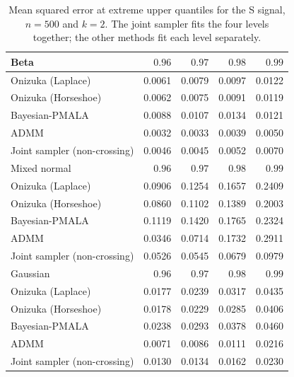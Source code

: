 \begin{table}[!htbp]
\centering
\small
\caption{Mean squared error at extreme upper quantiles for the S signal, $n=500$ and $k=2$. The joint sampler fits the four levels together; the other methods fit each level separately.}
\label{tab:s_ext_upper_mse}
\begin{tabular}{lrrrr}
\toprule
Beta & $0.96$ & $0.97$ & $0.98$ & $0.99$ \\
\midrule
Onizuka (Laplace) & 0.0061 & 0.0079 & 0.0097 & 0.0122 \\
Onizuka (Horseshoe) & 0.0062 & 0.0075 & 0.0091 & 0.0119 \\
Bayesian-PMALA & 0.0088 & 0.0107 & 0.0134 & 0.0121 \\
ADMM & 0.0032 & 0.0033 & 0.0039 & 0.0050 \\
Joint sampler (non-crossing) & 0.0046 & 0.0045 & 0.0052 & 0.0070 \\
\midrule
Mixed normal & $0.96$ & $0.97$ & $0.98$ & $0.99$ \\
\midrule
Onizuka (Laplace) & 0.0906 & 0.1254 & 0.1657 & 0.2409 \\
Onizuka (Horseshoe) & 0.0860 & 0.1102 & 0.1389 & 0.2003 \\
Bayesian-PMALA & 0.1119 & 0.1420 & 0.1765 & 0.2324 \\
ADMM & 0.0346 & 0.0714 & 0.1732 & 0.2911 \\
Joint sampler (non-crossing) & 0.0526 & 0.0545 & 0.0679 & 0.0979 \\
\midrule
Gaussian & $0.96$ & $0.97$ & $0.98$ & $0.99$ \\
\midrule
Onizuka (Laplace) & 0.0177 & 0.0239 & 0.0317 & 0.0435 \\
Onizuka (Horseshoe) & 0.0178 & 0.0229 & 0.0285 & 0.0406 \\
Bayesian-PMALA & 0.0238 & 0.0293 & 0.0378 & 0.0460 \\
ADMM & 0.0071 & 0.0086 & 0.0111 & 0.0216 \\
Joint sampler (non-crossing) & 0.0130 & 0.0134 & 0.0162 & 0.0230 \\
\bottomrule
\end{tabular}
\end{table}

